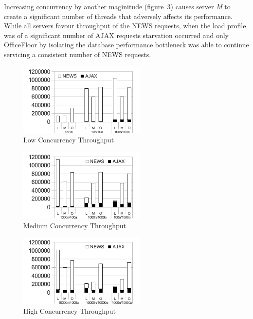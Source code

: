 \documentclass[conference]{ieee/IEEEtran}
\begin{document}
Increasing concurrency by another maginitude
(figure~\ref{fig:high_concurrency_throughput}) causes server \textit{M} to
create a significant number of threads that adversely affects its performance. 
While all servers favour throughput of the NEWS requests, when the load profile
was of a significant number of AJAX requests starvation occurred and only
OfficeFloor by isolating the database performance bottleneck was able to
continue servicing a consistent number of NEWS requests.

\begin{figure}[!t]
\centering 
\includegraphics[width=2.5in]{LowConcurrencyThroughput}
\caption{Low Concurrency Throughput}
\label{fig:low_concurrency_throughput}
\end{figure}


\begin{figure}[!t]
\centering 
\includegraphics[width=2.5in]{MediumConcurrencyThroughput}
\caption{Medium Concurrency Throughput}
\label{fig:medium_concurrency_throughput}
\end{figure}

\begin{figure}[!t]
\centering 
\includegraphics[width=2.5in]{HighConcurrencyThroughput}
\caption{High Concurrency Throughput}
\label{fig:high_concurrency_throughput}
\end{figure}
  
\end{document}
